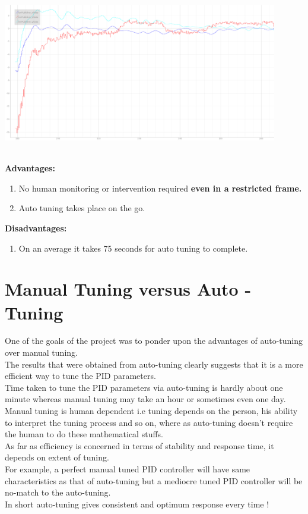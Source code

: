 \documentclass[a4paper,12pt,oneside]{book}
\begin{document}
\begin{enumerate}
\includegraphics[width = 12cm , height= 7cm]{Autotune_iteration_2.png}

\end{enumerate}
\pagebreak
\textbf{Advantages:}\vspace{1em}
            \begin{enumerate}
                \item No human monitoring or intervention required \textbf{even in a restricted frame.}
                \item Auto tuning takes place on the go.
            \end{enumerate}
            
            
            \textbf{Disadvantages:}
            
            
            \begin{enumerate}
                \item On an average it takes 75 seconds for auto tuning to complete.
            \end{enumerate}


\section{Manual Tuning versus Auto - Tuning }
One of the goals of the project was to ponder upon the advantages of auto-tuning over manual tuning.\\
The results that were obtained from auto-tuning clearly suggests that it is a more efficient way to tune the PID parameters.\\
Time taken to tune the PID parameters via auto-tuning is hardly about one minute whereas manual tuning may take an hour or sometimes even one day.\\
Manual tuning is human dependent i.e tuning depends on the person, his ability to interpret the tuning process and so on, where as auto-tuning doesn't require the human to do these mathematical stuffs.\\
As far as efficiency is concerned in terms of stability and response time, it depends on extent of tuning.\\
For example, a perfect manual tuned PID controller will have same characteristics as that of auto-tuning but a mediocre tuned PID controller will be no-match to the auto-tuning.\\
In short auto-tuning gives consistent and optimum response every time !
\end{document}
